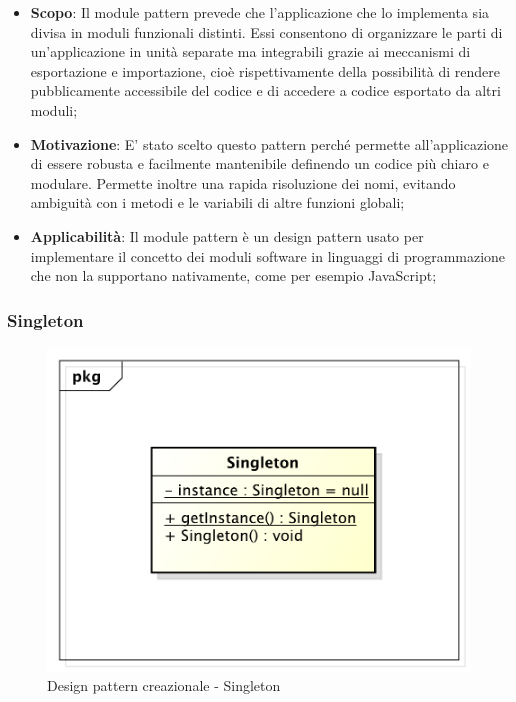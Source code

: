 		\begin{itemize}
			\item \textbf{Scopo}: Il module pattern prevede che l'applicazione che lo implementa sia divisa in moduli funzionali distinti. Essi consentono di organizzare le parti di un’applicazione in unità separate ma integrabili grazie ai meccanismi di esportazione e importazione, cioè rispettivamente della possibilità di rendere pubblicamente accessibile del codice e di accedere a codice esportato da altri moduli;

			\item \textbf{Motivazione}: E' stato scelto questo pattern perché permette all'applicazione di essere robusta e facilmente mantenibile definendo un codice più chiaro e modulare. Permette inoltre una rapida risoluzione dei nomi, evitando ambiguità con i metodi e le variabili di altre funzioni globali;

			\item \textbf{Applicabilità}: Il module pattern è un design pattern usato per implementare il concetto dei moduli software in linguaggi di programmazione che non la supportano nativamente, come per esempio JavaScript;

		\end{itemize}

		\newpage
		\subsubsection{Singleton} %

		\begin{figure}[htbp]
			\centering
			\centerline{\includegraphics[scale=0.5]{./images/designpatternappendice/singleton.pdf}}
			\caption{Design pattern creazionale - Singleton}
		\end{figure}

